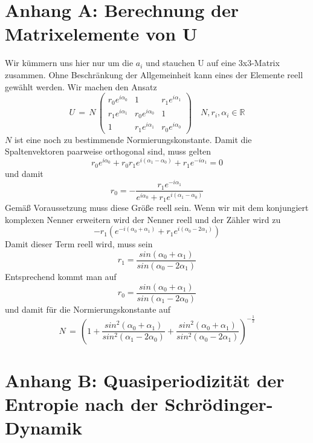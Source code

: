 \documentclass[12pt]{article}
\begin{document}
\section{Anhang A: Berechnung der Matrixelemente von U}

Wir kümmern uns hier nur um die $a_i$ und stauchen U auf eine 3x3-Matrix zusammen. Ohne Beschränkung der Allgemeinheit kann eines der Elemente reell gewählt werden. Wir machen den Ansatz
\begin{equation*}
U\, =\, N \, 
\begin{pmatrix}
r_0 e^{i\alpha_0} & 1 & r_1 e^{i\alpha_1} \\
r_1 e^{i\alpha_1} & r_0 e^{i\alpha_0} & 1 \\
1 & r_1 e^{i\alpha_1} & r_0 e^{i\alpha_0}
\end{pmatrix}
\quad N, r_i, \alpha_i \in \mathbb{R}
\end{equation*}
$N$ ist eine noch zu bestimmende Normierungskonstante. Damit die Spaltenvektoren paarweise orthogonal sind, muss gelten
\begin{equation*}
r_0 e^{i\alpha_0} + r_0 r_1 e^{i(\alpha_1 - \alpha_0)} + r_1 e^{-i\alpha_1} = 0
\end{equation*}
und damit 
\begin{equation*}
r_0 = - \frac{r_1 e^{-i\alpha_1}}{ e^{i\alpha_0} + r_1 e^{i(\alpha_1 - \alpha_0)} }
\end{equation*}
Gemäß Voraussetzung muss diese Größe reell sein. Wenn wir mit dem konjungiert komplexen Nenner erweitern wird der Nenner reell und der Zähler wird zu
\begin{equation*}
-r_1 \left( e^{-i(\alpha_0+\alpha_1)} + r_1 e^{i(\alpha_0-2\alpha_1)} \right)
\end{equation*}
Damit dieser Term reell wird, muss sein
\begin{equation*}
r_1=\frac{sin(\alpha_0+\alpha_1)}{sin(\alpha_0-2\alpha_1)}
\end{equation*}
Entsprechend kommt man auf 
\begin{equation*}
r_0=\frac{sin(\alpha_0+\alpha_1)}{sin(\alpha_1-2\alpha_0)}
\end{equation*}
und damit für die Normierungskonstante auf 
\begin{equation*}
N\, = \, \left( 1 +
\frac{sin^2(\alpha_0+\alpha_1)}{sin^2(\alpha_1-2\alpha_0)} +
\frac{sin^2(\alpha_0+\alpha_1)}{sin^2(\alpha_0-2\alpha_1)} \right)^{-\frac{1}{2}}
\end{equation*}

\section{Anhang B: Quasiperiodizität der Entropie nach der Schrödinger-Dynamik}
\end{document}
